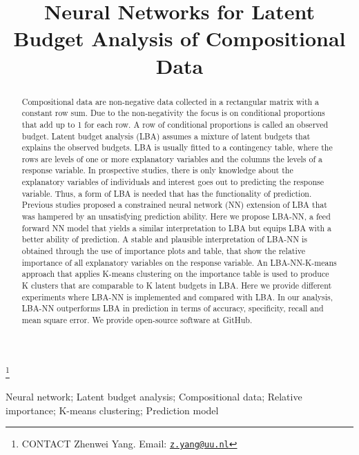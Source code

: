 \documentclass[]{interact}
\theoremstyle{plain}%
\theoremstyle{definition}
\theoremstyle{remark}
\begin{document}

\title{Neural Networks for Latent Budget Analysis of Compositional Data}


\author{
}

\thanks{CONTACT Zhenwei
Yang. Email: \href{mailto:z.yang@uu.nl}{\nolinkurl{z.yang@uu.nl}}}

\maketitle

\begin{abstract}
Compositional data are non-negative data collected in a rectangular
matrix with a constant row sum. Due to the non-negativity the focus is
on conditional proportions that add up to 1 for each row. A row of
conditional proportions is called an observed budget. Latent budget
analysis (LBA) assumes a mixture of latent budgets that explains the
observed budgets. LBA is usually fitted to a contingency table, where
the rows are levels of one or more explanatory variables and the columns
the levels of a response variable. In prospective studies, there is only
knowledge about the explanatory variables of individuals and interest
goes out to predicting the response variable. Thus, a form of LBA is
needed that has the functionality of prediction. Previous studies
proposed a constrained neural network (NN) extension of LBA that was
hampered by an unsatisfying prediction ability. Here we propose LBA-NN,
a feed forward NN model that yields a similar interpretation to LBA but
equips LBA with a better ability of prediction. A stable and plausible
interpretation of LBA-NN is obtained through the use of importance plots
and table, that show the relative importance of all explanatory
variables on the response variable. An LBA-NN-K-means approach that
applies K-means clustering on the importance table is used to produce K
clusters that are comparable to K latent budgets in LBA. Here we provide
different experiments where LBA-NN is implemented and compared with LBA.
In our analysis, LBA-NN outperforms LBA in prediction in terms of
accuracy, specificity, recall and mean square error. We provide
open-source software at GitHub.
\end{abstract}

\begin{keywords}
Neural network; Latent budget analysis; Compositional data; Relative
importance; K-means clustering; Prediction model
\end{keywords}
\end{document}
